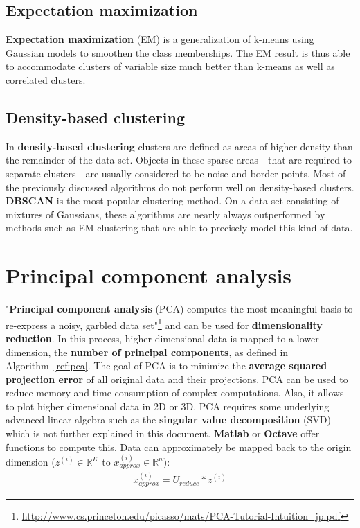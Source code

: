 \documentclass{report}
\begin{document}
\subsection{Expectation maximization}
{\bf Expectation maximization} (EM) is a generalization of k-means using Gaussian models to smoothen the class memberships. The EM result is thus able to accommodate clusters of variable size much better than k-means as well as correlated clusters.

\subsection{Density-based clustering}
In {\bf density-based clustering} clusters are defined as areas of higher density than the remainder of the data set.
Objects in these sparse areas - that are required to separate clusters - are usually considered to be noise and border points.
Most of the previously discussed algorithms do not perform well on density-based clusters.
{\bf DBSCAN} is the most popular clustering method.
On a data set consisting of mixtures of Gaussians, these algorithms are nearly always outperformed by methods such as EM clustering that are able to precisely model this kind of data.


\section{Principal component analysis}
\label{ref:pcasection}
"{\bf Principal component analysis} (PCA) computes the most meaningful basis to re-express a noisy, garbled data set"\footnote{\url{http://www.cs.princeton.edu/picasso/mats/PCA-Tutorial-Intuition_jp.pdf}} and can be used for {\bf dimensionality reduction}. In this process, higher dimensional data is mapped to a lower dimension, the {\bf number of principal components}, as defined in Algorithm~\ref{ref:pca}. The goal of PCA is to minimize the {\bf average squared projection error} of all original data and their projections. PCA can be used to reduce memory and time consumption of complex computations. Also, it allows to plot higher dimensional data in 2D or 3D. PCA requires some underlying advanced linear algebra such as the {\bf singular value decomposition} (SVD) which is not further explained in this document. {\bf Matlab} or {\bf Octave} offer functions to compute this. Data can  approximately be mapped back to the origin dimension ($z^{(i)}\in \mathbb{R}^K$ to $x_{approx}^{(i)} \in \mathbb{R}^n$):
\begin{align*}
x_{approx}^{(i)} = U_{reduce}*z^{(i)}
\end{align*}
\end{document}
